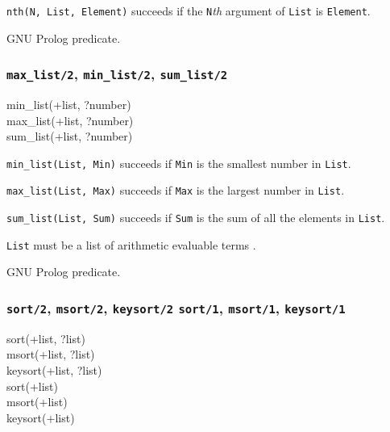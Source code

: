 \Description

\texttt{nth(N, List, Element)} succeeds if the \texttt{N}\emph{th}
argument of \texttt{List} is \texttt{Element}.

\PlErrorsNone

\Portability

GNU Prolog predicate.

\subsubsection{\texttt{max\_list/2},
               \texttt{min\_list/2},
               \texttt{sum\_list/2}}

\begin{TemplatesOneCol}
min\_list(+list, ?number)\\
max\_list(+list, ?number)\\
sum\_list(+list, ?number)

\end{TemplatesOneCol}

\Description

\texttt{min\_list(List, Min)} succeeds if \texttt{Min} is the
smallest number in \texttt{List}.

\texttt{max\_list(List, Max)} succeeds if \texttt{Max} is the
largest number in \texttt{List}.

\texttt{sum\_list(List, Sum)} succeeds if \texttt{Sum} is the
sum of all the elements in \texttt{List}.

\texttt{List} must be a list of arithmetic evaluable terms
.

\PlErrorsNone

\Portability

GNU Prolog predicate.

\subsubsection{\texttt{sort/2},
               \texttt{msort/2},
               \texttt{keysort/2}
               \texttt{sort/1},
               \texttt{msort/1},
               \texttt{keysort/1}}
\label{sort/2}

\begin{TemplatesOneCol}
sort(+list, ?list)\\
msort(+list, ?list)\\
keysort(+list, ?list)\\
sort(+list)\\
msort(+list)\\
keysort(+list)

\end{TemplatesOneCol}

